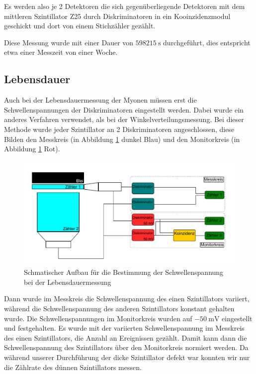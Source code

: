 \documentclass{article}
\begin{document}
Es werden also je 2 Detektoren die sich gegenüberliegende Detektoren mit dem mittleren Szintillator Z25 durch Diskriminatoren in ein Kooinzidenzmodul geschickt und dort von einem Stichzähler gezählt.

Diese Messung wurde mit einer Dauer von $\SI{598215}{\second}$ durchgeführt, dies entspricht etwa einer Messzeit von einer Woche.


\subsection{Lebensdauer}
Auch bei der Lebensdauermessung der Myonen müssen erst die Schwellenspannungen der Diskriminatoren eingestellt werden.
Dabei wurde ein anderes Verfahren verwendet, als bei der Winkelverteilungsmessung.
Bei dieser Methode wurde jeder Szintillator an 2 Diskriminatoren angeschlossen, diese Bilden den Messkreis (in Abbildung \ref{fig:AufbauLebensdauer} dunkel Blau) und den Monitorkreis (in Abbildung \ref{fig:AufbauLebensdauer} Rot).
\begin{figure}[H]
    \centering
    \includegraphics[width=1\textwidth]{figures/Aufbau_Lebensdauermessung.pdf}
    \caption{Schmatischer Aufbau für die Bestimmung der Schwellenspannung bei der Lebensdauermessung}
    \label{fig:AufbauLebensdauer}
\end{figure}
Dann wurde im Messkreis die Schwellenspannung des einen Szintillators variiert, während die Schwellenspannung des anderen Szintillators konstant gehalten wurde.
Die Schwellenspannungen im Monitorkreis wurden auf $\SI{-50}{\milli\volt}$ eingestellt und festgehalten.
Es wurde mit der variierten Schwellenspannung im Messkreis des einen Szintillators, die Anzahl an Ereignissen gezählt.
Damit kann dann die Schwellenspannung des Szintillators über den Monitorkreis normiert werden. 
Da während unserer Durchführung der dicke Szintillator defekt war konnten wir nur die Zählrate des dünnen Szintillators messen.
\end{document}
